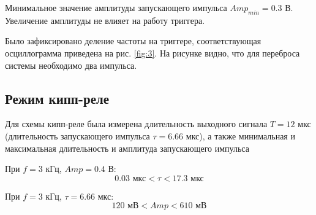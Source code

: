 Минимальное значение амплитуды запускающего импульса $Amp_{ min} = 0.3$ В. Увеличение амплитуды не влияет на работу
триггера.

Было зафиксировано деление частоты на триггере, соответствующая осциллограмма приведена на рис. \ref{fig:3}. На рисунке
видно, что для переброса системы необходимо два импульса. 

\subsection*{Режим кипп-реле}

Для схемы кипп-реле была измерена длительность выходного сигнала $T = 12$ мкс (длительность запускающего импульса $\tau
= 6.66$ мкс), а также минимальная и максимальная длительность и амплитуда запускающего импульса 

При $f=3$ кГц, $Amp=0.4$ В:
$$0.03\text{ мкс}<\tau<17.3\text{ мкс} $$

При $f=3$ кГц, $\tau = 6.66$ мкс:
$$120\text{ мВ}<Amp<610\text{ мВ} $$


